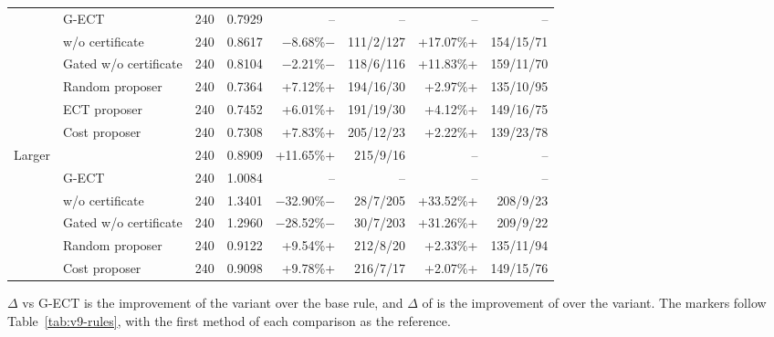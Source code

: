 \begin{table}
\begin{threeparttable}
\begin{tabular*}{\textwidth}{@{\extracolsep{\fill}}llrrrrrr@{}}
 & G-ECT & 240 & 0.7929 & -- & -- & -- & -- \\
 & w/o certificate & 240 & 0.8617 & $-$8.68\%$-$ & 111/2/127 & +17.07\%+ & 154/15/71 \\
 & Gated w/o certificate & 240 & 0.8104 & $-$2.21\%$-$ & 118/6/116 & +11.83\%+ & 159/11/70 \\
 & Random proposer & 240 & 0.7364 & +7.12\%+ & 194/16/30 & +2.97\%+ & 135/10/95 \\
 & ECT proposer & 240 & 0.7452 & +6.01\%+ & 191/19/30 & +4.12\%+ & 149/16/75 \\
 & Cost proposer & 240 & 0.7308 & +7.83\%+ & 205/12/23 & +2.22\%+ & 139/23/78 \\
\midrule
Larger & \pgnd{} & 240 & 0.8909 & +11.65\%+ & 215/9/16 & -- & -- \\
 & G-ECT & 240 & 1.0084 & -- & -- & -- & -- \\
 & w/o certificate & 240 & 1.3401 & $-$32.90\%$-$ & 28/7/205 & +33.52\%+ & 208/9/23 \\
 & Gated w/o certificate & 240 & 1.2960 & $-$28.52\%$-$ & 30/7/203 & +31.26\%+ & 209/9/22 \\
 & Random proposer & 240 & 0.9122 & +9.54\%+ & 212/8/20 & +2.33\%+ & 135/11/94 \\
 & Cost proposer & 240 & 0.9098 & +9.78\%+ & 216/7/17 & +2.07\%+ & 149/15/76 \\
\bottomrule
\end{tabular*}
\begin{tablenotes}\footnotesize
\item $\Delta$ vs G-ECT is the improvement of the variant over the base rule, and $\Delta$ of \pgnd{} is the improvement of \pgnd{} over the variant. The markers follow Table~\ref{tab:v9-rules}, with the first method of each comparison as the reference.
\end{tablenotes}
\end{threeparttable}
\end{table}

